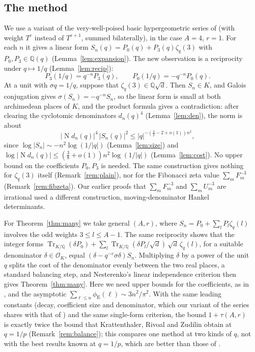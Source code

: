 \documentclass[11pt]{amsart}
\theoremstyle{definition}
\theoremstyle{remark}
\numberwithin{equation}{section}
\newcommand{\QQ}{\mathbb{Q}}
\newcommand{\cO}{\mathcal{O}}
\newcommand{\Nm}{\operatorname{N}}
\newcommand{\eu}{\phi_{\mathrm E}}
\begin{document}
\subsection*{The method}
We use a variant of the very-well-poised basic hypergeometric series of \cite[\S3]{KRZ06} (with weight $T^e$ instead of
$T^{e+1}$, summed bilaterally), in the case $A=4$, $r=1$. For each $n$ it gives a linear form $S_n(q)=P_0(q)+P_3(q)\zeta_q(3)$ with $P_0,P_3\in\QQ(q)$
(Lemma~\ref{lem:expansion}). The new observation is a reciprocity under $q\mapsto1/q$ (Lemma~\ref{lem:recip}):
\[
P_3(1/q)=q^{-n}P_3(q),\qquad P_0(1/q)=-q^{-n}P_0(q).
\]
At a unit with $\sigma q=1/q$, suppose that $\zeta_q(3)\in\QQ\sqrt d$. Then $S_n\in K$, and Galois conjugation gives
$\sigma(S_n)=-q^{-n}S_n$, so the linear form is small at both archimedean places of $K$, and the product formula gives a contradiction: after clearing the cyclotomic
denominators $d_n(q)^4$ (Lemma~\ref{lem:den}), the norm is about
\[
|\Nm d_n(q)|^4\,|S_n(q)|^2\le|q|^{-(\frac32-2+o(1))n^2},
\]
since $\log|S_n|\sim-n^2\log(1/|q|)$ (Lemma~\ref{lem:size}) and $\log|\Nm d_n(q)|\le(\frac38+o(1))n^2\log(1/|q|)$
(Lemma~\ref{lem:cost}). No upper bound on the coefficients $P_0,P_3$ is needed. The same construction gives nothing
for $\zeta_q(3)$ itself (Remark~\ref{rem:plain}), nor for the Fibonacci zeta value $\sum_mF_m^{-3}$
(Remark~\ref{rem:fibzeta}). Our earlier proofs that $\sum_mF_m^{-3}$ and $\sum_mU_m^{-3}$ are irrational
\cite{Kri26a,Kri26b} used a different construction, moving-denominator Hankel determinants.

For Theorem~\ref{thm:many} we take general $(A,r)$, where $S_n=P_0+\sum_lP_l\zeta_q(l)$ involves the odd weights
$3\le l\le A-1$. The same reciprocity shows that the integer forms
$\operatorname{Tr}_{K/\QQ}(\delta P_0)+\sum_l\operatorname{Tr}_{K/\QQ}(\delta P_l/\sqrt d)\,\sqrt d\,\zeta_q(l)$, for a
suitable denominator $\delta\in\cO_K$, equal $(\delta-q^{-e}\sigma\delta)S_n$. Multiplying $\delta$ by a power of the
unit $q$ splits the cost of the denominator evenly between the two real places, a standard balancing step, and
Nesterenko's linear independence criterion then gives Theorem~\ref{thm:many}. Here we need upper bounds for the
coefficients, as in \cite{KRZ06}, and the asymptotic $\sum_{\ell\le n}\eu(\ell)\sim3n^2/\pi^2$. With the same leading
constants (decay, coefficient size and denominator, which our variant of the series shares with that of \cite{KRZ06})
and the same single-form criterion, the bound $1+\tau(A,r)$ is exactly twice the bound that Krattenthaler, Rivoal and
Zudilin obtain at $q=1/p$ (Remark~\ref{rem:balance}); this compares one method at two kinds of $q$, not with the best results known at $q=1/p$, which are better than those of \cite{KRZ06}
\cite{JM10,FZ10}.
\end{document}

